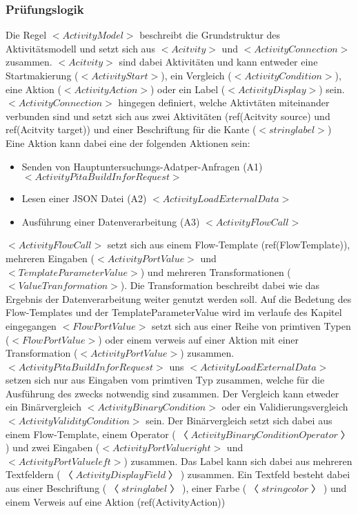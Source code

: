 \documentclass{article}
\begin{document}
    \subsubsection{Prüfungslogik}
    Die Regel $<ActivityModel>$ beschreibt die Grundstruktur des Aktivitätsmodell und setzt sich aus $<Acitvity>$ und $<ActivityConnection>$ zusammen. 
    $<Acitvity>$ sind dabei Aktivitäten und kann entweder eine Startmakierung ($<ActivityStart>$), ein Vergleich ($<ActivityCondition>$), eine Aktion ($<ActivityAction>$) oder ein Label ($<ActivityDisplay>$) sein.
    $<ActivityConnection>$ hingegen definiert, welche Aktivtäten miteinander verbunden sind und setzt sich aus zwei Aktivitäten (ref(Acitvity source) und ref(Acitvity target)) und einer Beschriftung für die Kante ($<string label>$)
    Eine Aktion kann dabei eine der folgenden Aktionen sein:
    \begin{itemize}
        \item Senden von Hauptuntersuchungs-Adatper-Anfragen (A1) $<ActivityPitaBuildInforRequest>$
        \item Lesen einer JSON Datei (A2) $<ActivityLoadExternalData>$
        \item Ausführung einer Datenverarbeitung (A3) $<ActivityFlowCall>$
    \end{itemize}
    $<ActivityFlowCall>$ setzt sich aus einem Flow-Template (ref(FlowTemplate)), mehreren Eingaben ($<ActivityPortValue>$ und $<TemplateParameterValue>$) und mehreren Transformationen ($<ValueTranformation>$).
    Die Transformation beschreibt dabei wie das Ergebnis der Datenverarbeitung weiter genutzt werden soll.
    Auf die Bedetung des Flow-Templates und der TemplateParameterValue wird im verlaufe des Kapitel eingegangen
    $<FlowPortValue>$ setzt sich aus einer Reihe von primtiven Typen ($<FlowPortValue>$) oder einem verweis auf einer Aktion mit einer Transformation ($<ActivityPortValue>$) zusammen.
    $<ActivityPitaBuildInforRequest>$ uns $<ActivityLoadExternalData>$ setzen sich nur aus Eingaben vom primtiven Typ zusammen, welche für die Ausführung des zwecks notwendig sind zusammen.
    Der Vergleich kann etweder ein Binärvergleich $<ActivityBinaryCondition>$ oder ein Validierungsvergleich $<ActivityValidityCondition>$ sein.
    Der Binärvergleich setzt sich dabei aus einem Flow-Template, einem Operator ($〈ActivityBinaryConditionOperator〉$) und zwei Eingaben ($<ActivityPortValue right>$ und $<ActivityPortValue left>$) zusammen.
    Das Label kann sich dabei aus mehreren Textfeldern ($〈ActivityDisplayField〉$) zusammen. Ein Textfeld besteht dabei aus einer Beschriftung ($〈string label〉$), einer Farbe ($〈string color〉$) und einem Verweis auf eine Aktion (ref(ActivityAction))
\end{document}
